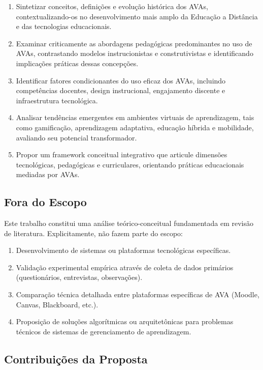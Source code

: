 \documentclass[portuguese]{sbc2025}%
\begin{document}
\begin{enumerate}
    \item Sintetizar conceitos, definições e evolução histórica dos AVAs, contextualizando-os no desenvolvimento mais amplo da Educação a Distância e das tecnologias educacionais.
    \item Examinar criticamente as abordagens pedagógicas predominantes no uso de AVAs, contrastando modelos instrucionistas e construtivistas e identificando implicações práticas dessas concepções.
    \item Identificar fatores condicionantes do uso eficaz dos AVAs, incluindo competências docentes, design instrucional, engajamento discente e infraestrutura tecnológica.
    \item Analisar tendências emergentes em ambientes virtuais de aprendizagem, tais como gamificação, aprendizagem adaptativa, educação híbrida e mobilidade, avaliando seu potencial transformador.
    \item Propor um framework conceitual integrativo que articule dimensões tecnológicas, pedagógicas e curriculares, orientando práticas educacionais mediadas por AVAs.
\end{enumerate}

\subsection{Fora do Escopo}

Este trabalho constitui uma análise teórico-conceitual fundamentada em revisão de literatura. Explicitamente, não fazem parte do escopo:

\begin{enumerate}
    \item Desenvolvimento de sistemas ou plataformas tecnológicas específicas.
    \item Validação experimental empírica através de coleta de dados primários (questionários, entrevistas, observações).
    \item Comparação técnica detalhada entre plataformas específicas de AVA (Moodle, Canvas, Blackboard, etc.).
    \item Proposição de soluções algorítmicas ou arquitetônicas para problemas técnicos de sistemas de gerenciamento de aprendizagem.
\end{enumerate}

\subsection{Contribuições da Proposta}
\end{document}
